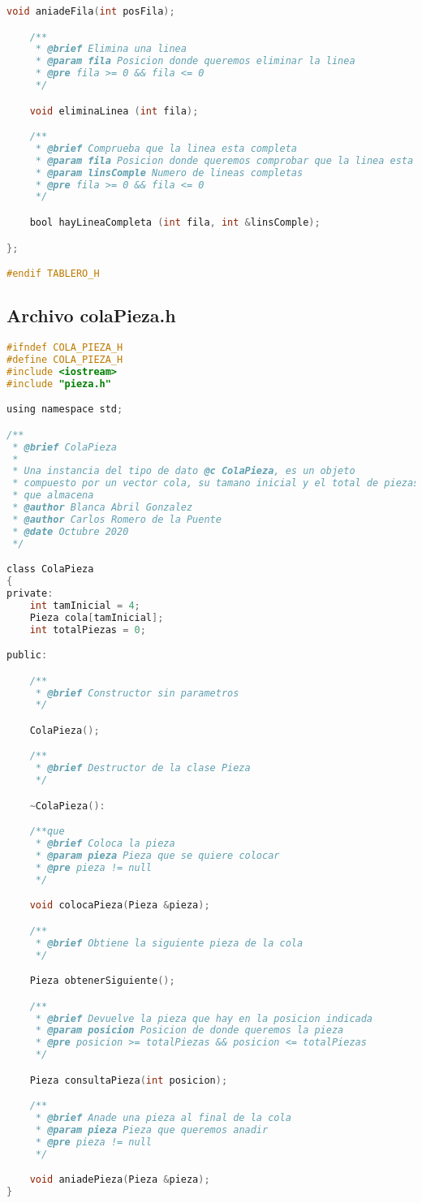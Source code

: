 \documentclass[12pt, spanish]{article}
\begin{document}
\begin{lstlisting}[language=C]
	void aniadeFila(int posFila);

	/**
	 * @brief Elimina una linea
	 * @param fila Posicion donde queremos eliminar la linea
	 * @pre fila >= 0 && fila <= 0
	 */

	void eliminaLinea (int fila);

	/**
	 * @brief Comprueba que la linea esta completa
	 * @param fila Posicion donde queremos comprobar que la linea esta completa
	 * @param linsComple Numero de lineas completas
	 * @pre fila >= 0 && fila <= 0
	 */

	bool hayLineaCompleta (int fila, int &linsComple);

};

#endif TABLERO_H
\end{lstlisting}

\pagebreak
 
\subsection{Archivo colaPieza.h}

\begin{lstlisting}[language=C]
#ifndef COLA_PIEZA_H
#define COLA_PIEZA_H
#include <iostream>
#include "pieza.h"

using namespace std;

/**
 * @brief ColaPieza
 *
 * Una instancia del tipo de dato @c ColaPieza, es un objeto
 * compuesto por un vector cola, su tamano inicial y el total de piezas  
 * que almacena
 * @author Blanca Abril Gonzalez
 * @author Carlos Romero de la Puente
 * @date Octubre 2020
 */

class ColaPieza
{
private:
	int tamInicial = 4;
	Pieza cola[tamInicial];
	int totalPiezas = 0;

public:

	/**
	 * @brief Constructor sin parametros
	 */

	ColaPieza();

	/**
	 * @brief Destructor de la clase Pieza
	 */

	~ColaPieza():

	/**que
	 * @brief Coloca la pieza
	 * @param pieza Pieza que se quiere colocar
	 * @pre pieza != null
	 */

	void colocaPieza(Pieza &pieza);

	/**
	 * @brief Obtiene la siguiente pieza de la cola
	 */

	Pieza obtenerSiguiente();

	/**
	 * @brief Devuelve la pieza que hay en la posicion indicada
	 * @param posicion Posicion de donde queremos la pieza
	 * @pre posicion >= totalPiezas && posicion <= totalPiezas
	 */

	Pieza consultaPieza(int posicion);

	/**
	 * @brief Anade una pieza al final de la cola
	 * @param pieza Pieza que queremos anadir
	 * @pre pieza != null
	 */

	void aniadePieza(Pieza &pieza);
}

\end{lstlisting}
\end{document}
